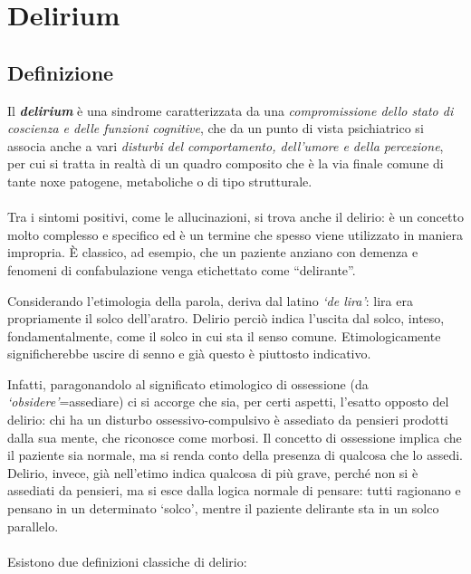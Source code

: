 \section{Delirium}

\subsection{Definizione}

Il \textbf{\emph{delirium}} è una sindrome caratterizzata da una
\emph{compromissione dello stato di coscienza e delle funzioni
cognitive}, che da un punto di vista psichiatrico si associa anche a
vari \emph{disturbi del comportamento, dell'umore e della percezione},
per cui si tratta in realtà di un quadro composito che è la via finale
comune di tante noxe patogene, metaboliche o di tipo strutturale.
\\\\
Tra i sintomi positivi, come le allucinazioni, si trova anche il
delirio: è un concetto molto complesso e specifico ed è un termine che
spesso viene utilizzato in maniera impropria. È classico, ad esempio,
che un paziente anziano con demenza e fenomeni di confabulazione venga
etichettato come ``delirante''.

Considerando l'etimologia della parola, deriva dal latino \emph{`de
lira'}: lira era propriamente il solco dell'aratro. Delirio perciò
indica l'uscita dal solco, inteso, fondamentalmente, come il solco in
cui sta il senso comune. Etimologicamente significherebbe uscire di
senno e già questo è piuttosto indicativo.

Infatti, paragonandolo al significato etimologico di ossessione (da
\emph{`obsidere'}=assediare) ci si accorge che sia, per certi aspetti,
l'esatto opposto del delirio: chi ha un disturbo ossessivo-compulsivo è
assediato da pensieri prodotti dalla sua mente, che riconosce come
morbosi. Il concetto di ossessione implica che il paziente sia normale,
ma si renda conto della presenza di qualcosa che lo assedi. Delirio,
invece, già nell'etimo indica qualcosa di più grave, perché non si è
assediati da pensieri, ma si esce dalla logica normale di pensare: tutti
ragionano e pensano in un determinato `solco', mentre il paziente
delirante sta in un solco parallelo.
\\\\
Esistono due definizioni classiche di delirio:

